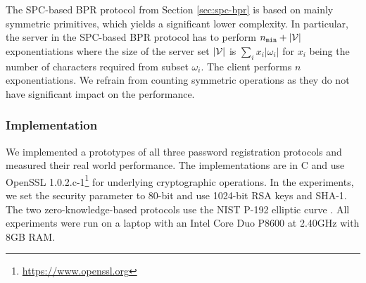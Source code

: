 The \ac{SPC}-based \ac{BPR} protocol from Section \ref{sec:spc-bpr} is based on mainly symmetric primitives, which yields a significant lower complexity.
In particular, the server in the \ac{SPC}-based \ac{BPR} protocol has to perform ${n_\mathtt{min}}+|\mathcal{V}|$ exponentiations where the size of the server set $|\mathcal{V}|$ is $\sum_i x_i|\omega_i|$ for $x_i$ being the number of characters required from subset $\omega_i$.
The client performs $n$ exponentiations.
We refrain from counting symmetric operations as they do not have significant impact on the performance.


\subsubsection{Implementation}
We implemented a prototypes of all three password registration protocols and measured their real world performance. 
The implementations are in C and use OpenSSL 1.0.2.c-1\footnote{\url{https://www.openssl.org}} for underlying cryptographic operations. 
In the experiments, we set the security parameter to 80-bit and use 1024-bit RSA keys and \mbox{{SHA-}1}. 
The two zero-knowledge-based protocols use the \ac{NIST} P-192 elliptic curve \cite{nistEC}.
All experiments were run on a laptop with an Intel Core Duo P8600 at 2.40GHz with 8GB RAM.

